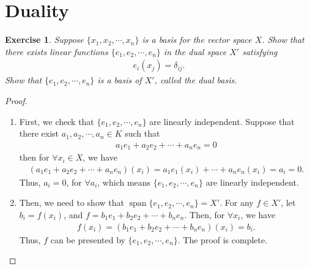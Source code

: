 \documentclass[10pt]{book}
\newtheorem{exercise}{Exercise}[section]
\theoremstyle{definition}
\numberwithin{equation}{chapter}
\begin{document}
\section{Duality}
\begin{exercise}
Suppose $\{x_1, x_2,\cdots, x_n\}$ is a basis for the vector space $X$. Show that there exists linear functions $\{e_1, e_2,\cdots, e_n\}$ in the dual space $X'$ satisfying 
\begin{align*}
    e_i(x_j) = \delta_{ij}.
\end{align*}
Show that $\{e_1, e_2,\cdots, e_n\}$ is a basis of $X'$, called the dual basis.
\end{exercise}
\begin{proof}
~\begin{enumerate}[label=(\alph*)]
    \item First, we check that $\{e_1, e_2, \cdots, e_n\}$ are linearly independent. Suppose that there exist  $a_1, a_2, \cdots, a_n \in K$ such that 
    \begin{align*}
        a_1 e_1 + a_2 e_2 + \cdots + a_n e_n = 0
    \end{align*}
    then for $\forall x_i \in X$, we have
    \begin{align*}
        (a_1 e_1 + a_2 e_2 + \cdots + a_n e_n)(x_i) = a_1 e_1(x_i) + \cdots + a_n e_n(x_i) = a_i = 0.
    \end{align*}
    Thus, $a_i = 0$, for $\forall a_i$, which means $\{e_1, e_2, \cdots, e_n\}$ are linearly independent.
    \item Then, we need to show that $\operatorname{span}\{e_1, e_2, \cdots, e_n\} = X'$. For any $f \in X'$, let $b_i  = f(x_i)$, and $f = b_1 e_1 + b_2 e_2 + \cdots + b_n e_n$. Then, for $\forall x_i$, we have
    \begin{align*}
        f(x_i) = (b_1 e_1 + b_2 e_2 + \cdots + b_n e_n)(x_i) = b_i.
    \end{align*}
    Thus, $f$ can be presented by $\{e_1, e_2, \cdots, e_n\}$. The proof is complete.
\end{enumerate}
\end{proof}

\medskip
\end{document}
